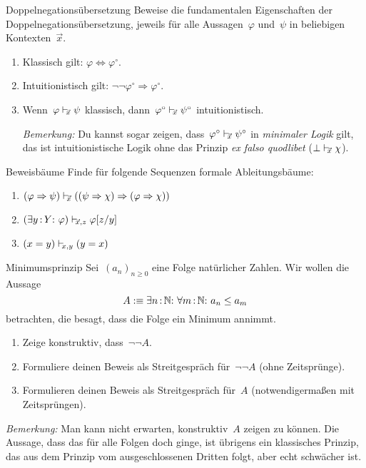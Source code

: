 \documentclass{pizzablatt}
\begin{document}

\begin{aufgabe}{Doppelnegationsübersetzung}
Beweise die fundamentalen Eigenschaften der Doppelnegationsübersetzung, jeweils für alle
Aussagen~$\varphi$ und~$\psi$ in beliebigen Kontexten~$\vec x$.
\begin{enumerate}
\item Klassisch gilt: $\varphi \Longleftrightarrow \varphi^\circ$.
\item Intuitionistisch gilt: $\neg\neg\varphi^\circ \Longrightarrow
\varphi^\circ$.
\item Wenn~$\varphi \mathrel{\vdash\!\!\!_{\vec x}} \psi$ klassisch, dann~$\varphi^\circ \mathrel{\vdash\!\!\!_{\vec
x}} \psi^\circ$ intuitionistisch.

\emph{Bemerkung:} Du kannst sogar zeigen, dass~$\varphi^\circ \mathrel{\vdash\!\!\!_{\vec x}}
\psi^\circ$ in \emph{minimaler Logik} gilt, das ist intuitionistische Logik
ohne das Prinzip \emph{ex falso quodlibet} ($\bot \mathrel{\vdash\!\!\!_{\vec x}} \chi$).
\end{enumerate}
\end{aufgabe}

\begin{aufgabe}{Beweisbäume}
Finde für folgende Sequenzen formale Ableitungsbäume:
\begin{enumerate}
\item $(\varphi \Rightarrow \psi) \mathrel{\vdash\!\!\!_{\vec x}} ((\psi \Rightarrow \chi)
\Rightarrow (\varphi \Rightarrow \chi))$
\item $(\exists y\,{:}\,Y{:}\ \varphi) \mathrel{\vdash\!\!\!_{\vec x,z}} \varphi[z/y]$
\item $(x = y) \mathrel{\vdash\!\!\!_{x,y}} (y = x)$
\end{enumerate}
\end{aufgabe}

\begin{aufgabe}{Minimumsprinzip}
Sei~$(a_n)_{n \geq 0}$ eine Folge natürlicher Zahlen. Wir wollen die Aussage
\[ A :\equiv \exists n\?\NN{:}\ \forall m\?\NN{:}\ a_n \leq a_m \]
betrachten, die besagt, dass die Folge ein Minimum annimmt.

\begin{enumerate}
\item Zeige konstruktiv, dass~$\neg\neg A$.
\item Formuliere deinen Beweis als Streitgespräch für~$\neg\neg A$ (ohne
Zeitsprünge).
\item Formulieren deinen Beweis als Streitgespräch für~$A$ (notwendigermaßen
mit Zeitsprüngen).
\end{enumerate}

\emph{Bemerkung:} Man kann nicht erwarten,
konstruktiv~$A$ zeigen zu können. Die Aussage, dass das für alle Folgen doch
ginge, ist übrigens ein klassisches Prinzip, das aus dem Prinzip vom
ausgeschlossenen Dritten folgt, aber echt schwächer ist.

\end{aufgabe}
\end{document}
